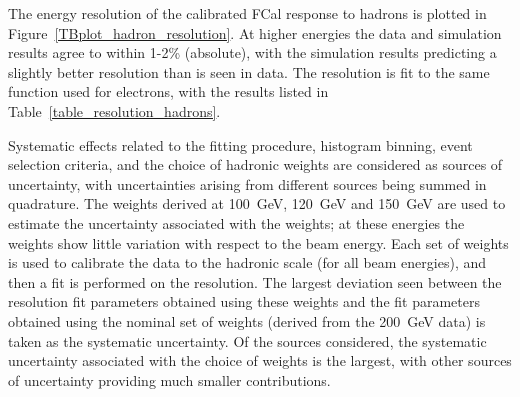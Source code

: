 The energy resolution of the calibrated FCal response to hadrons is plotted in Figure~\ref{TBplot_hadron_resolution}. At higher energies the data and simulation results agree to within 1-2\% (absolute), with the simulation results predicting a slightly better resolution than is seen in data.  The resolution is fit to the same function used for electrons, with the results listed in Table~\ref{table_resolution_hadrons}.







Systematic effects related to the fitting procedure, histogram binning, event selection criteria, and the choice of hadronic weights are considered as sources of uncertainty, with uncertainties arising from different sources being summed in quadrature. The weights derived at 100~GeV, 120~GeV and 150~GeV are used to estimate the uncertainty associated with the weights; at these energies the weights show little variation with respect to the beam energy. Each set of weights is used to calibrate the data to the hadronic scale (for all beam energies), and then a fit is performed on the resolution. The largest deviation seen between the resolution fit parameters obtained using these weights and the fit parameters obtained using the nominal set of weights (derived from the 200~GeV data) is taken as the systematic uncertainty. Of the sources considered, the systematic uncertainty associated with the choice of weights is the largest, with other sources of uncertainty providing much smaller contributions. 

